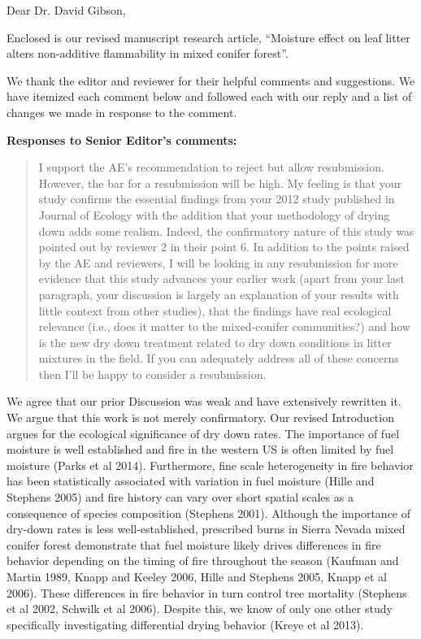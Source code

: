 \documentclass[letterpaper, 12pt]{letter}
\begin{document}
\begin{letter}{}

\opening{Dear Dr. David Gibson,}

Enclosed is our revised manuscript research article, ``Moisture effect on leaf
litter alters non-additive flammability in mixed conifer forest''.

We thank the editor and reviewer for their helpful comments and suggestions. We
have itemized each comment below and followed each with our reply and a list of
changes we made in response to the comment. 

{\bf Responses to Senior Editor's comments:}

\begin{quote}
  I support the AE's recommendation to reject but allow resubmission. However,
  the bar for a resubmission will be high. My feeling is that your study
  confirms the essential findings from your 2012 study published in Journal of
  Ecology with the addition that your methodology of drying down adds some
  realism. Indeed, the confirmatory nature of this study was pointed out by
  reviewer 2 in their point 6. In addition to the points raised by the AE and
  reviewers, I will be looking in any resubmission for more evidence that this
  study advances your earlier work (apart from your last paragraph, your
  discussion is largely an explanation of your results with little context from
  other studies), that the findings have real ecological relevance (i.e., does
  it matter to the mixed-conifer communities?) and how is the new dry down
  treatment related to dry down conditions in litter mixtures in the field. If
  you can adequately address all of these concerns then I'll be happy to
  consider a resubmission.
\end{quote}

We agree that our prior Discussion was weak and have extensively rewritten it.
We argue that this work is not merely confirmatory. Our revised Introduction
argues for the ecological significance of dry down rates. The importance of
fuel moisture is well established and fire in the western US is often limited
by fuel moisture (Parks et al 2014). Furthermore, fine scale heterogeneity in
fire behavior has been statistically associated with variation in fuel
moisture (Hille and Stephens 2005) and fire history can vary over short spatial
scales as a consequence of species composition (Stephens 2001). Although the
importance of dry-down rates is less well-established, prescribed burns in
Sierra Nevada mixed conifer forest demonstrate that fuel moisture likely drives
differences in fire behavior depending on the timing of fire throughout the
season (Kaufman and Martin 1989, Knapp and Keeley 2006, Hille and Stephens
2005, Knapp et al 2006). These differences in fire behavior in turn control
tree mortality (Stephens et al 2002, Schwilk et al 2006). Despite this, we know
of only one other study specifically investigating differential drying behavior
(Kreye et al 2013).


\end{letter}
\end{document}
